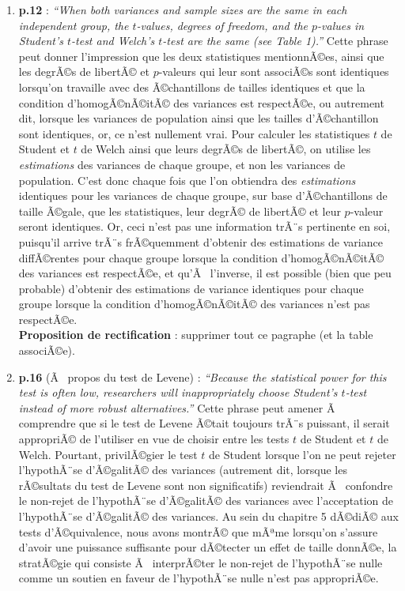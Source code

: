 \begin{appendix}
\begin{enumerate}
\def\labelenumi{\arabic{enumi})}
\item
  \textbf{p.12} : \emph{``When both variances and sample sizes are the
  same in each independent group, the \(t\)-values, degrees of freedom,
  and the \(p\)-values in Student's \(t\)-test and Welch's \(t\)-test
  are the same (see Table 1).''} Cette phrase peut donner l'impression
  que les deux statistiques mentionnÃ©es, ainsi que les degrÃ©s de
  libertÃ© et \(p\)-valeurs qui leur sont associÃ©s sont identiques
  lorsqu'on travaille avec des Ã©chantillons de tailles identiques et
  que la condition d'homogÃ©nÃ©itÃ© des variances est respectÃ©e, ou
  autrement dit, lorsque les variances de population ainsi que les
  tailles d'Ã©chantillon sont identiques, or, ce n'est nullement vrai.
  Pour calculer les statistiques \(t\) de Student et \(t\) de Welch
  ainsi que leurs degrÃ©s de libertÃ©, on utilise les \emph{estimations}
  des variances de chaque groupe, et non les variances de population.
  C'est donc chaque fois que l'on obtiendra des \emph{estimations}
  identiques pour les variances de chaque groupe, sur base
  d'Ã©chantillons de taille Ã©gale, que les statistiques, leur degrÃ© de
  libertÃ© et leur \(p\)-valeur seront identiques. Or, ceci n'est pas
  une information trÃ¨s pertinente en soi, puisqu'il arrive trÃ¨s
  frÃ©quemment d'obtenir des estimations de variance diffÃ©rentes pour
  chaque groupe lorsque la condition d'homogÃ©nÃ©itÃ© des variances est
  respectÃ©e, et qu'Ã~ l'inverse, il est possible (bien que peu
  probable) d'obtenir des estimations de variance identiques pour chaque
  groupe lorsque la condition d'homogÃ©nÃ©itÃ© des variances n'est pas
  respectÃ©e.\\
  \color{blue} \textbf{Proposition de rectification} : supprimer tout ce
  pagraphe (et la table associÃ©e). \color{black}
\item
  \textbf{p.16} (Ã~ propos du test de Levene) : \emph{``Because the
  statistical power for this test is often low, researchers will
  inappropriately choose Student's \(t\)-test instead of more robust
  alternatives.''} Cette phrase peut amener Ã~ comprendre que si le test
  de Levene Ã©tait toujours trÃ¨s puissant, il serait appropriÃ© de
  l'utiliser en vue de choisir entre les tests \(t\) de Student et \(t\)
  de Welch. Pourtant, privilÃ©gier le test \(t\) de Student lorsque l'on
  ne peut rejeter l'hypothÃ¨se d'Ã©galitÃ© des variances (autrement dit,
  lorsque les rÃ©sultats du test de Levene sont non significatifs)
  reviendrait Ã~ confondre le non-rejet de l'hypothÃ¨se d'Ã©galitÃ© des
  variances avec l'acceptation de l'hypothÃ¨se d'Ã©galitÃ© des
  variances. Au sein du chapitre 5 dÃ©diÃ© aux tests d'Ã©quivalence,
  nous avons montrÃ© que mÃªme lorsqu'on s'assure d'avoir une puissance
  suffisante pour dÃ©tecter un effet de taille donnÃ©e, la stratÃ©gie
  qui consiste Ã~ interprÃ©ter le non-rejet de l'hypothÃ¨se nulle comme
  un soutien en faveur de l'hypothÃ¨se nulle n'est pas appropriÃ©e.
\end{enumerate}


\end{appendix}
